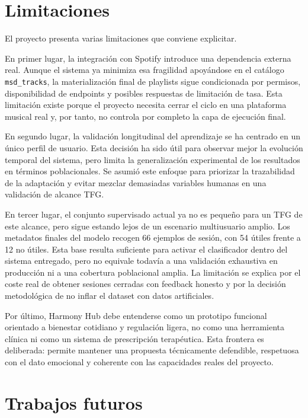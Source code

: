 \section{Limitaciones}
\label{sec:limitaciones}

El proyecto presenta varias limitaciones que conviene explicitar.

En primer lugar, la integración con Spotify introduce una dependencia externa
real. Aunque el sistema ya minimiza esa fragilidad apoyándose en el catálogo
\texttt{msd\_tracks}, la materialización final de playlists sigue condicionada
por permisos, disponibilidad de endpoints y posibles respuestas de
limitación de tasa. Esta limitación existe porque el proyecto necesita cerrar el ciclo
en una plataforma musical real y, por tanto, no controla por completo la capa
de ejecución final.

En segundo lugar, la validación longitudinal del aprendizaje se ha centrado en
un único perfil de usuario. Esta decisión ha sido útil para observar mejor la
evolución temporal del sistema, pero limita la generalización experimental de
los resultados en términos poblacionales. Se asumió este enfoque para
priorizar la trazabilidad de la adaptación y evitar mezclar demasiadas
variables humanas en una validación de alcance TFG.

En tercer lugar, el conjunto supervisado actual ya no es pequeño para un TFG
de este alcance, pero sigue estando lejos de un escenario multiusuario amplio.
Los metadatos finales del modelo recogen 66 ejemplos de sesión, con 54 útiles
frente a 12 no útiles. Esta base resulta suficiente para activar el
clasificador dentro del sistema entregado, pero no equivale todavía a una
validación exhaustiva en producción ni a una cobertura poblacional amplia. La
limitación se explica por el coste real de obtener sesiones cerradas con
feedback honesto y por la decisión metodológica de no inflar el dataset con
datos artificiales.

Por último, Harmony Hub debe entenderse como un prototipo funcional orientado a
bienestar cotidiano y regulación ligera, no como una herramienta clínica ni
como un sistema de prescripción terapéutica. Esta frontera es deliberada:
permite mantener una propuesta técnicamente defendible, respetuosa con el dato
emocional y coherente con las capacidades reales del proyecto.

\section{Trabajos futuros}
\label{sec:trabajos_futuros}

